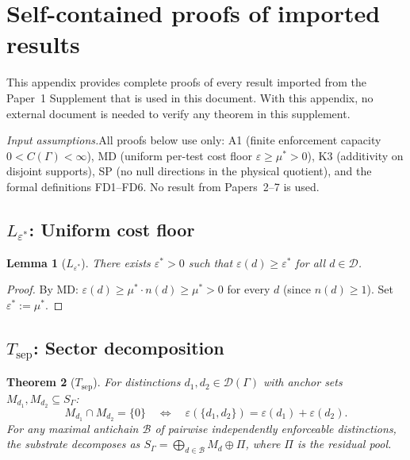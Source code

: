 \documentclass[11pt,a4paper]{article}
\newtheorem{theorem_app}{Theorem}[section]
\newtheorem{lemma_app}[theorem_app]{Lemma}
\theoremstyle{definition}
\begin{document}
\section{Self-contained proofs of imported results}
\label{app:imported}

This appendix provides complete proofs of every result imported from the
Paper~1 Supplement that is used in this document.  With this appendix,
no external document is needed to verify any theorem in this supplement.

\smallskip\noindent\textit{Input assumptions.}\quad All proofs below
use only: A1 (finite enforcement capacity $0 < C(\Gamma) < \infty$),
MD (uniform per-test cost floor $\varepsilon \ge \mu^* > 0$),
K3 (additivity on disjoint supports), SP (no null directions in the
physical quotient), and the formal definitions FD1--FD6.  No result
from Papers~2--7 is used.


\subsection{$L_{\varepsilon^*}$: Uniform cost floor}
\label{app:Leps}

\begin{lemma_app}[$L_{\varepsilon^*}$]
There exists $\varepsilon^* > 0$ such that
$\varepsilon(d) \ge \varepsilon^*$ for all $d \in \mathcal{D}$.
\end{lemma_app}

\begin{proof}
By MD: $\varepsilon(d) \ge \mu^* \cdot n(d) \ge \mu^* > 0$ for every
$d$ (since $n(d) \ge 1$).  Set $\varepsilon^* := \mu^*$.
\end{proof}


\subsection{$T_{\mathrm{sep}}$: Sector decomposition}
\label{app:Tsep}

\begin{theorem_app}[$T_{\mathrm{sep}}$]
For distinctions $d_1, d_2 \in \mathcal{D}(\Gamma)$ with anchor sets
$M_{d_1}, M_{d_2} \subseteq S_\Gamma$:
\[
  M_{d_1} \cap M_{d_2} = \{0\}
  \quad\Longleftrightarrow\quad
  \varepsilon(\{d_1, d_2\}) = \varepsilon(d_1) + \varepsilon(d_2).
\]
For any maximal antichain $\mathcal{B}$ of pairwise independently
enforceable distinctions, the substrate decomposes as
$S_\Gamma = \bigoplus_{d \in \mathcal{B}} M_d \oplus \Pi$,
where $\Pi$ is the residual pool.
\end{theorem_app}
\end{document}
